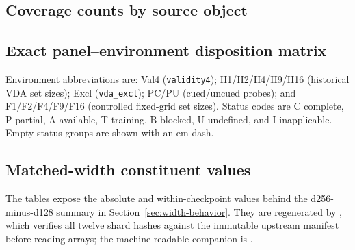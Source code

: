\documentclass[11pt,a4paper]{article}
\newcommand{\env}[1]{\texttt{#1}}
\begin{document}
\MThreeFullPlates

\begin{landscape}
\section{Coverage counts by source object}\label{app:coverage-counts}
\begin{center}
\label{tab:coverage-status}

\end{center}

\end{landscape}

\begin{landscape}
\section{Exact panel--environment disposition matrix}
Environment abbreviations are: Val4 (\env{validity4}); H1/H2/H4/H9/H16 (historical VDA set sizes); Excl (\env{vda\_excl}); PC/PU (cued/uncued probes); and F1/F2/F4/F9/F16 (controlled fixed-grid set sizes). Status codes are C complete, P partial, A available, T training, B blocked, U undefined, and I inapplicable. Empty status groups are shown with an em dash.


\end{landscape}

\begin{landscape}
\section{Matched-width constituent values}\label{app:matched-width-constituents}
The tables expose the absolute and within-checkpoint values behind the d256-minus-d128 summary in Section~\ref{sec:width-behavior}. They are regenerated by , which verifies all twelve shard hashes against the immutable upstream manifest before reading arrays; the machine-readable companion is .


\end{landscape}
\end{document}
